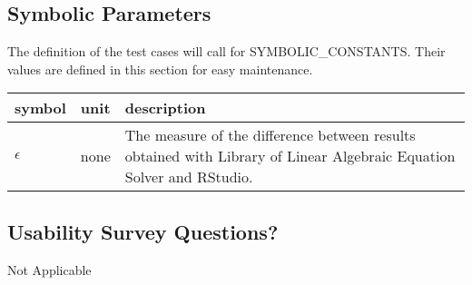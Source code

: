 \documentclass[12pt, titlepage]{article}
\begin{document}
\subsection{Symbolic Parameters}

The definition of the test cases will call for SYMBOLIC\_CONSTANTS.
Their values are defined in this section for easy maintenance.

\renewcommand{\arraystretch}{1.2}
\noindent \begin{longtable*}{l l p{12cm}} \toprule
\textbf{symbol} & \textbf{unit} & \textbf{description}\\
\midrule

$\epsilon$ & none & The measure of the difference between results obtained with Library of Linear Algebraic Equation Solver
and RStudio.\\

\bottomrule
\end{longtable*}


\subsection{Usability Survey Questions?}

Not Applicable
\end{document}
